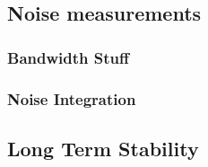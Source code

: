 \subsection{Noise measurements}

\subsubsection{Bandwidth Stuff}

\subsubsection{Noise Integration}

\subsection{Long Term Stability}

